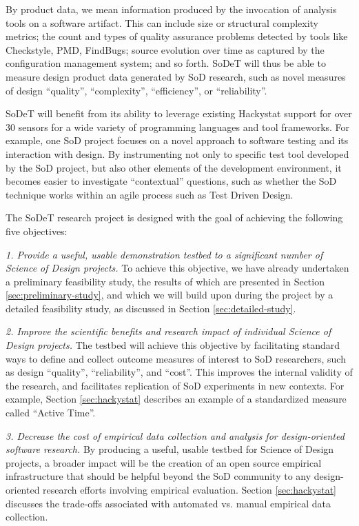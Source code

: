 By product data, we mean information produced by the invocation of analysis
tools on a software artifact.  This can include size or structural
complexity metrics; the count and types of quality assurance problems
detected by tools like Checkstyle, PMD, FindBugs; source evolution over
time as captured by the configuration management system; and so forth. 
SoDeT will thus be able to measure design product data generated by
SoD research, such as novel measures of design ``quality'', ``complexity'',
``efficiency'', or ``reliability''.

SoDeT will benefit from its ability to leverage existing Hackystat
support for over 30 sensors for a wide variety of programming languages and
tool frameworks.  For example, one SoD project focuses on a novel approach
to software testing and its interaction with design.  By instrumenting not
only to specific test tool developed by the SoD project, but also other
elements of the development environment, it becomes easier to investigate
``contextual'' questions, such as whether the SoD technique works within an
agile process such as Test Driven Design.

The SoDeT research project is designed with the goal of achieving the
following five objectives:

{\em 1. Provide a useful, usable demonstration testbed to a significant
number of Science of Design projects.} To achieve this objective, we have
already undertaken a preliminary feasibility study, the results of which are presented in
Section \ref{sec:preliminary-study}, and which we will build upon during the
project by a detailed feasibility study, as discussed in Section
\ref{sec:detailed-study}.

{\em 2. Improve the scientific benefits and research impact of individual
Science of Design projects.} The testbed will achieve this objective by
facilitating standard ways to define and collect outcome measures of interest to SoD
researchers, such as design ``quality'', ``reliability'', and ``cost''.
This improves the internal validity of the research, and facilitates replication
of SoD experiments in new contexts.  For example, Section \ref{sec:hackystat} describes an
example of a standardized measure called ``Active Time''.

{\em 3. Decrease the cost of empirical data collection and analysis for
design-oriented software research.}  By producing a useful, usable testbed
for Science of Design projects, a broader impact will be the creation of an
open source empirical infrastructure that should be helpful beyond the SoD
community to any design-oriented research efforts involving empirical
evaluation. Section \ref{sec:hackystat} discusses the trade-offs associated with 
automated vs. manual empirical data collection.

